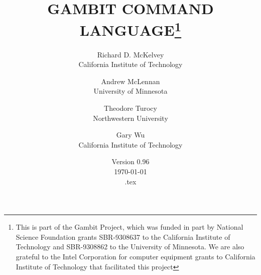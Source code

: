 %
%
%


\renewcommand{\baselinestretch}{.9}
\newcommand{\bd}{\begin{description}}
\newcommand{\ed}{\end{description}}

\newcommand{\tindex}[1]{{\tt #1}\index{{\tt #1}}}
\newcommand{\bindex}[1]{{\bf #1}\index{#1}}
\newcommand{\rindex}[1]{{#1}\index{#1}}
\makeindex


\newcommand{\lex}[1]{\mark{#1}\index{{\tt #1}}}

\makeatletter
\def\ps@lexicon{\def\@oddhead{\slshape\mysectionname\hfil 
{\Large\verb+\botmark+}\quad\thepage}
\def\@evenhead{\thepage\quad{\Large\verb+\firstmark+}\hfil \slshape\mysectionname}}
\makeatother

\newcommand{\mysectionname}{\thesection\,\, BUILT-IN FUNCTIONS}






\title{GAMBIT COMMAND LANGUAGE\thanks{This is part of the Gambit
Project, which was funded in part by National Science Foundation
grants SBR-9308637 to the California Institute of Technology and
SBR-9308862 to the University of Minnesota.  We are also grateful to
the Intel Corporation for computer equipment grants to California
Institute of Technology that facilitated this project}}

\author{Richard D. McKelvey\\California Institute of
Technology
\and
Andrew McLennan\\University of
Minnesota
\and 
Theodore Turocy\\Northwestern University
\and
Gary Wu\\California Institute of Technology
}

\date{Version 0.96\\ \today\\ \jobname.tex}

\maketitle


